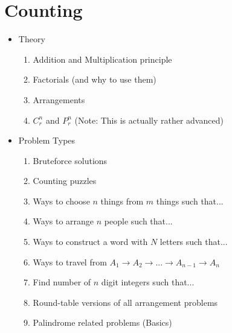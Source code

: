 \documentclass[oneside]{book}
\begin{document}
\section{Counting}
\begin{itemize}
    \item Theory
        \begin{enumerate}
            \item Addition and Multiplication principle
            \item Factorials (and why to use them)
            \item Arrangements
            \item $C^{n}_r$ and $P^{n}_r$ (Note: This is actually rather advanced)
        \end{enumerate}
    \item Problem Types
        \begin{enumerate}
            \item Bruteforce solutions
            \item Counting puzzles
            \item Ways to choose $n$ things from $m$ things such that...
            \item Ways to arrange $n$ people such that...
            \item Ways to construct a word with $N$ letters such that...
            \item Ways to travel from $A_1 \rightarrow A_2\rightarrow ... \rightarrow A_{n-1} \rightarrow A_n$
            \item Find number of $n$ digit integers such that...
            \item Round-table versions of all arrangement problems
            \item Palindrome related problems (Basics)
        \end{enumerate}
\end{itemize}
\end{document}
